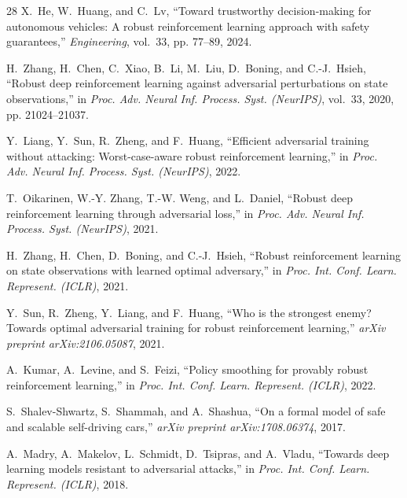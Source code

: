 \documentclass[conference]{IEEEtran}
\begin{document}
\begin{thebibliography}{28}
X.~He, W.~Huang, and C.~Lv, ``Toward trustworthy decision-making for autonomous vehicles: A robust reinforcement learning approach with safety guarantees,'' \emph{Engineering}, vol.~33, pp. 77--89, 2024.

H.~Zhang, H.~Chen, C.~Xiao, B.~Li, M.~Liu, D.~Boning, and C.-J.~Hsieh, ``Robust deep reinforcement learning against adversarial perturbations on state observations,'' in \emph{Proc. Adv. Neural Inf. Process. Syst. (NeurIPS)}, vol.~33, 2020, pp. 21024--21037.

Y.~Liang, Y.~Sun, R.~Zheng, and F.~Huang, ``Efficient adversarial training without attacking: Worst-case-aware robust reinforcement learning,'' in \emph{Proc. Adv. Neural Inf. Process. Syst. (NeurIPS)}, 2022.

T.~Oikarinen, W.-Y. Zhang, T.-W. Weng, and L.~Daniel, ``Robust deep reinforcement learning through adversarial loss,'' in \emph{Proc. Adv. Neural Inf. Process. Syst. (NeurIPS)}, 2021.

H.~Zhang, H.~Chen, D.~Boning, and C.-J.~Hsieh, ``Robust reinforcement learning on state observations with learned optimal adversary,'' in \emph{Proc. Int. Conf. Learn. Represent. (ICLR)}, 2021.

Y.~Sun, R.~Zheng, Y.~Liang, and F.~Huang, ``Who is the strongest enemy? Towards optimal adversarial training for robust reinforcement learning,'' \emph{arXiv preprint arXiv:2106.05087}, 2021.

A.~Kumar, A.~Levine, and S.~Feizi, ``Policy smoothing for provably robust reinforcement learning,'' in \emph{Proc. Int. Conf. Learn. Represent. (ICLR)}, 2022.

S.~Shalev-Shwartz, S.~Shammah, and A.~Shashua, ``On a formal model of safe and scalable self-driving cars,'' \emph{arXiv preprint arXiv:1708.06374}, 2017.

A.~Madry, A.~Makelov, L.~Schmidt, D.~Tsipras, and A.~Vladu, ``Towards deep learning models resistant to adversarial attacks,'' in \emph{Proc. Int. Conf. Learn. Represent. (ICLR)}, 2018.

\end{thebibliography}
\end{document}
